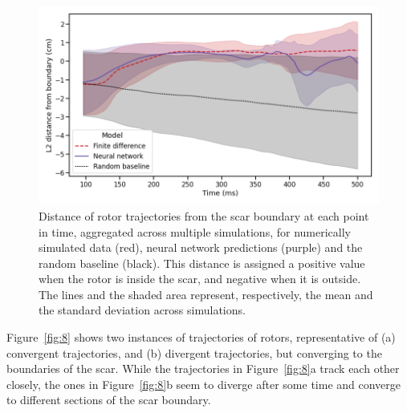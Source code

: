 \documentclass[utf8]{frontiersSCNS} %
\begin{document}
\begin{figure}[!htp]
\centering
\includegraphics[width=.8\textwidth]{Figure-10.png}
\caption{Distance of rotor trajectories from the scar boundary at each point in time, aggregated across multiple simulations, for numerically simulated data (red), neural network predictions (purple) and the random baseline (black). This distance is assigned a positive value when the rotor is inside the scar, and negative when it is outside. The lines and the shaded area represent, respectively, the mean and the standard deviation across simulations.
}
\label{fig:10}
\end{figure}

Figure~\ref{fig:8} shows two instances of trajectories of rotors, representative of (a) convergent trajectories, and (b) divergent trajectories, but converging to the boundaries of the scar. While the trajectories in Figure~\ref{fig:8}a track each other closely, the ones in Figure~\ref{fig:8}b seem to diverge after some time and converge to different sections of the scar boundary.
\end{document}

